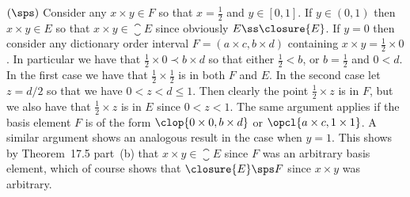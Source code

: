 {{    $(\sps)$ Consider any $x \times y \in F$ so that $x = \tfrac{1}{2}$ and $y \in [0,1]$.
    If $y \in (0,1)$ then $x \times y \in E$ so that $x \times y \in \closure{E}$ since obviously $E \ss \closure{E}$.
    If $y = 0$ then consider any dictionary order interval $F = (a \times c, b \times d)$ containing $x \times y = \tfrac{1}{2} \times 0$.
    In particular we have that $\tfrac{1}{2} \times 0 \prec b \times d$ so that either $\tfrac{1}{2} < b$, or $b = \tfrac{1}{2}$ and $0 < d$.
    In the first case we have that $\tfrac{1}{2} \times \tfrac{1}{2}$ is in both $F$ and $E$.
    In the second case let $z = d/2$ so that we have $0 < z < d \leq 1$.
    Then clearly the point $\tfrac{1}{2} \times z$ is in $F$, but we also have that $\tfrac{1}{2} \times z$ is in $E$ since $0 < z < 1$.
    The same argument applies if the basis element $F$ is of the form $\clop{0 \times 0, b \times d}$ or $\opcl{a \times c, 1 \times 1}$.
    A similar argument shows an analogous result in the case when $y = 1$.
    This shows by Theorem~17.5 part~(b) that $x \times y \in \closure{E}$ since $F$ was an arbitrary basis element, which of course shows that $\closure{E} \sps F$ since $x \times y$ was arbitrary.
  }
}

